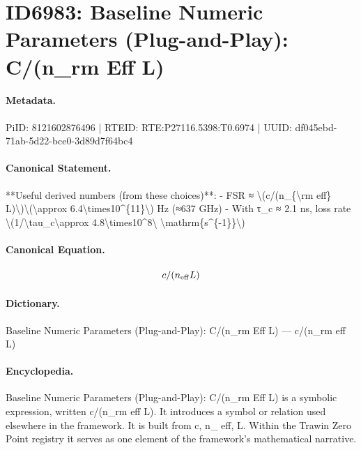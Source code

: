 \section*{ID6983: Baseline Numeric Parameters (Plug-and-Play): C/(n\_rm Eff L)}
\paragraph{Metadata.}
PiID: 8121602876496 | RTEID: RTE:P27116.5398:T0.6974 | UUID: df045ebd-71ab-5d22-bce0-3d89d7f64bc4

\paragraph{Canonical Statement.}
**Useful derived numbers (from these choices)**: - FSR ≈ \textbackslash{}(c/(n\_\{\textbackslash{}rm eff\} L)\textbackslash{})\textbackslash{}(\textbackslash{}approx 6.4\textbackslash{}times10\textasciicircum{}\{11\}\textbackslash{}) Hz (≈637 GHz) - With τ\_c ≈ 2.1 ns, loss rate \textbackslash{}(1/\textbackslash{}tau\_c\textbackslash{}approx 4.8\textbackslash{}times10\textasciicircum{}8\textbackslash{} \textbackslash{}mathrm\{s\textasciicircum{}\{-1\}\}\textbackslash{})

\paragraph{Canonical Equation.}
\[
c/(n_{\rm eff} L)
\]

\paragraph{Dictionary.}
Baseline Numeric Parameters (Plug-and-Play): C/(n\_rm Eff L) — c/(n\_rm eff L)

\paragraph{Encyclopedia.}
Baseline Numeric Parameters (Plug-and-Play): C/(n\_rm Eff L) is a symbolic expression, written c/(n\_rm eff L). It introduces a symbol or relation used elsewhere in the framework. It is built from c, n\_ eff, L. Within the Trawin Zero Point registry it serves as one element of the framework's mathematical narrative.
